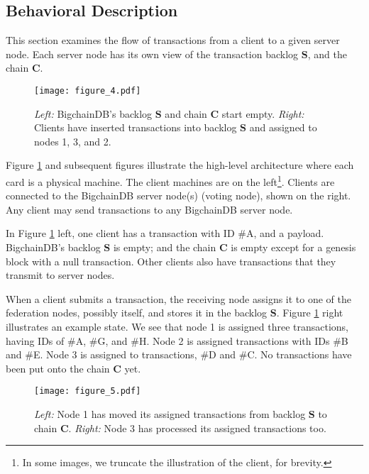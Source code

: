 \subsection{Behavioral Description}
This section examines the flow of transactions from a client to a given server node.
Each server node has its own view of the transaction backlog $\mathbf{S}$, and the chain $\mathbf{C}$.

\begin{figure}[!ht]
  \centering
  \texttt{[image: figure\_4.pdf]}
  \caption{\textit{Left:} BigchainDB’s backlog $\mathbf{S}$ and chain $\mathbf{C}$ start empty.
  \textit{Right:} Clients have inserted transactions into backlog $\mathbf{S}$ and assigned to nodes 1, 3, and 2.}
  \label{fig:bigchaindb_architecture_step1}
\end{figure}

Figure \ref{fig:bigchaindb_architecture_step1} and subsequent figures illustrate the high-level architecture where each card is a physical machine.
The client machines are on the left\footnote{In some images, we truncate the illustration of the client, for brevity.}.
Clients are connected to the BigchainDB server node(s) (voting node), shown on the right. Any client may send transactions to any BigchainDB server node.

In Figure \ref{fig:bigchaindb_architecture_step1} left, one client has a transaction with ID \textsf{$\#$A}, and a payload.
BigchainDB’s backlog $\mathbf{S}$ is empty; and the chain $\mathbf{C}$ is empty except for a genesis block with a null transaction.
Other clients also have transactions that they transmit to server nodes.

When a client submits a transaction, the receiving node assigns it to one of the federation nodes, possibly itself, and stores it in the backlog $\mathbf{S}$.
Figure \ref{fig:bigchaindb_architecture_step1} right illustrates an example state.
We see that node 1 is assigned three transactions, having IDs of \textsf{$\#$A}, \textsf{$\#$G}, and \textsf{$\#$H}.
Node 2 is assigned transactions with IDs \textsf{$\#$B} and \textsf{$\#$E}.
Node 3 is assigned to transactions, \textsf{$\#$D} and \textsf{$\#$C}. No transactions have been put onto the chain $\mathbf{C}$ yet.

\begin{figure}[!ht]
  \centering
  \texttt{[image: figure\_5.pdf]}
  \caption{\textit{Left:} Node 1 has moved its assigned transactions from backlog $\mathbf{S}$ to chain $\mathbf{C}$.
  \textit{Right:} Node 3 has processed its assigned transactions too.}
  \label{fig:bigchaindb_architecture_step2}
\end{figure}

